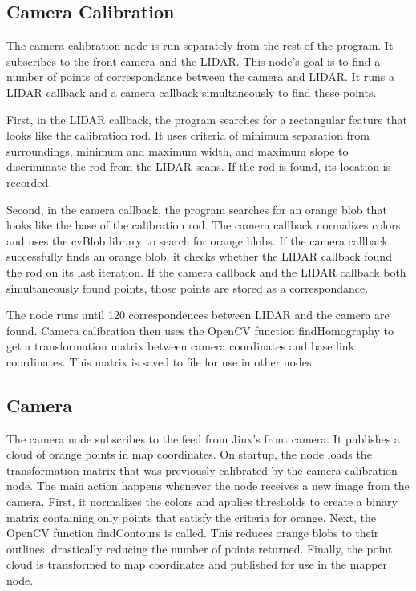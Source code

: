 \documentclass{article}
\begin{document}
\subsection{Camera Calibration}

The camera calibration node is run separately from the rest of the program.  It subscribes to the front camera and the LIDAR.  This node's goal is to find a number of points of correspondance between the camera and LIDAR.  It runs a LIDAR callback and a camera callback simultaneously to find these points.

First, in the LIDAR callback, the program searches for a rectangular feature that looks like the calibration rod.  It uses criteria of minimum separation from surroundings, minimum and maximum width, and maximum slope to discriminate the rod from the LIDAR scans.  If the rod is found, its location is recorded.

Second, in the camera callback, the program searches for an orange blob that looks like the base of the calibration rod.  The camera callback normalizes colors and uses the cvBlob library to search for orange blobs.  If the camera callback successfully finds an orange blob, it checks whether the LIDAR callback found the rod on its last iteration.  If the camera callback and the LIDAR callback both simultaneously found points, those points are stored as a correspondance.

The node runs until 120 correspondences between LIDAR and the camera are found.  Camera calibration then uses the OpenCV function findHomography to get a transformation matrix between camera coordinates and base link coordinates.  This matrix is saved to file for use in other nodes. 

\subsection{Camera}

The camera node subscribes to the feed from Jinx's front camera.  It publishes a cloud of orange points in map coordinates.  On startup, the node loads the transformation matrix that was previously calibrated by the camera calibration node.  The main action happens whenever the node receives a new image from the camera.  First, it normalizes the colors and applies thresholds to create a binary matrix containing only points that satisfy the criteria for orange.  Next, the OpenCV function findContours is called.  This reduces orange blobs to their outlines, drastically reducing the number of points returned.
Finally, the point cloud is transformed to map coordinates and published for use in the mapper node.
\end{document}
